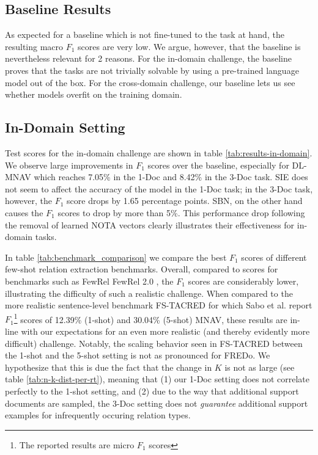 \documentclass[11pt]{article}
\begin{document}
\subsection{Baseline Results}
As expected for a baseline which is not fine-tuned to the task at hand, the resulting macro $F_1$ scores are very low.
We argue, however, that the baseline is nevertheless relevant for 2 reasons. 
For the in-domain challenge, the baseline proves that the tasks are not trivially solvable by using a pre-trained language model out of the box.
For the cross-domain challenge, our baseline lets us see whether models overfit on the training domain.


\subsection{In-Domain Setting}



Test scores for the in-domain challenge are shown in table \ref{tab:results-in-domain}.
We observe large improvements in $F_1$ scores over the baseline, especially for DL-MNAV which reaches 7.05\% in the 1-Doc and 8.42\% in the 3-Doc task.
SIE does not seem to affect the accuracy of the model in the 1-Doc task; in the 3-Doc task, however, the $F_1$ score drops by 1.65 percentage points.
SBN, on the other hand causes the $F_1$ scores to drop by more than 5\%.
This performance drop following the removal of learned NOTA vectors clearly illustrates their effectiveness for in-domain tasks.


In table \ref{tab:benchmark_comparison} we compare the best $F_1$ scores of different few-shot relation extraction benchmarks.
Overall, compared to scores for benchmarks such as FewRel \cite{han_fewrel_2018} FewRel 2.0 \cite{gao_fewrel_2019}, the $F_1$ scores are considerably lower, illustrating the difficulty of such a realistic challenge.
When compared to the more realistic sentence-level benchmark FS-TACRED \cite{sabo_revisiting_2021} for which Sabo et al. report $F_1$\footnote{The reported results are micro $F_1$ scores} scores of 12.39\% (1-shot) and 30.04\% (5-shot) MNAV, these results are in-line with our expectations for an even more realistic (and thereby evidently more difficult) challenge.
Notably, the scaling behavior seen in FS-TACRED between the 1-shot and the 5-shot setting is not as pronounced for FREDo. We hypothesize that this is due the fact that the change in $K$ is not as large (see table \ref{tab:n-k-dist-per-rt}), meaning that (1) our 1-Doc setting does not correlate perfectly to the 1-shot setting, and (2) due to the way that additional support documents are sampled, the 3-Doc setting does not \textit{guarantee} additional support examples for infrequently occuring relation types.
\end{document}
